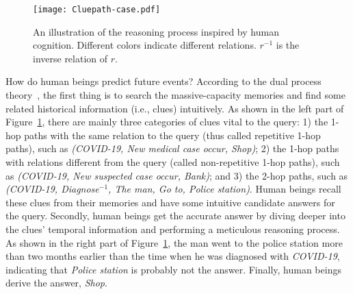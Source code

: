 \documentclass[11pt,a4paper]{article}
\begin{document}
\begin{figure}[tbp] 
  \centering
  \texttt{[image: Cluepath-case.pdf]}
  \caption{An illustration of the reasoning process inspired by human cognition.
  Different colors indicate different relations. $r^{-1}$ is the inverse relation of
  $r$.}
  \vspace{-5mm}
  \label{fig:case}
  \end{figure}
 

  How do human beings predict future events? According to the dual process
  theory~\cite{evans1984heuristic, evans2003two, evans2008dual,
  sloman1996empirical}, the first thing is to search the massive-capacity
  memories and find some related historical information (i.e., clues)
  intuitively. As shown in the left part of Figure~\ref{fig:case}, there are
  mainly three categories of clues vital to the query: 1) the 1-hop paths with
  the same relation to the query (thus called repetitive 1-hop paths), such as
  \emph{(COVID-19, New medical case occur, Shop)}; 2) the 1-hop paths with
  relations different from the query (called non-repetitive 1-hop paths), such
  as \emph{(COVID-19, New suspected case occur, Bank)}; and 3) the 2-hop paths,
  such as \emph{(COVID-19, Diagnose$^{-1}$, The man, Go to, Police station)}.
  Human beings recall these clues from their memories and have some intuitive
  candidate answers for the query. Secondly, human beings get the accurate
  answer by diving deeper into the clues' temporal information and performing a
  meticulous reasoning process. As shown in the right part of
  Figure~\ref{fig:case}, the man went to the police station more than two months
  earlier than the time when he was diagnosed with \emph{COVID-19}, indicating
  that \emph{Police station} is probably not the answer. Finally, human beings
  derive the answer, \emph{Shop}. 
  
  
\end{document}
